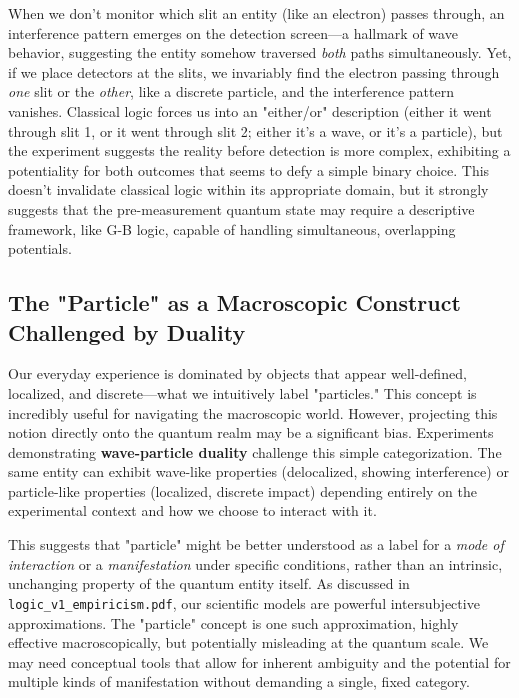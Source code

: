 \documentclass{article}
\begin{document}
When we don't monitor which slit an entity (like an electron) passes through, an interference pattern emerges on the detection screen---a hallmark of wave behavior, suggesting the entity somehow traversed \textit{both} paths simultaneously. Yet, if we place detectors at the slits, we invariably find the electron passing through \textit{one} slit or the \textit{other}, like a discrete particle, and the interference pattern vanishes. Classical logic forces us into an "either/or" description (either it went through slit 1, or it went through slit 2; either it's a wave, or it's a particle), but the experiment suggests the reality before detection is more complex, exhibiting a potentiality for both outcomes that seems to defy a simple binary choice. This doesn't invalidate classical logic within its appropriate domain, but it strongly suggests that the pre-measurement quantum state may require a descriptive framework, like G-B logic, capable of handling simultaneous, overlapping potentials.

\subsection{The "Particle" as a Macroscopic Construct Challenged by Duality}

Our everyday experience is dominated by objects that appear well-defined, localized, and discrete---what we intuitively label "particles." This concept is incredibly useful for navigating the macroscopic world. However, projecting this notion directly onto the quantum realm may be a significant bias. Experiments demonstrating \textbf{wave-particle duality} challenge this simple categorization. The same entity can exhibit wave-like properties (delocalized, showing interference) or particle-like properties (localized, discrete impact) depending entirely on the experimental context and how we choose to interact with it.

This suggests that "particle" might be better understood as a label for a \textit{mode of interaction} or a \textit{manifestation} under specific conditions, rather than an intrinsic, unchanging property of the quantum entity itself. As discussed in \texttt{logic\_v1\_empiricism.pdf}, our scientific models are powerful intersubjective approximations. The "particle" concept is one such approximation, highly effective macroscopically, but potentially misleading at the quantum scale. We may need conceptual tools that allow for inherent ambiguity and the potential for multiple kinds of manifestation without demanding a single, fixed category.
\end{document}

